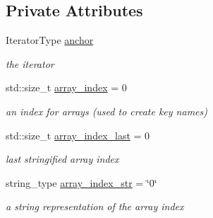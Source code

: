 \subsection*{Private Attributes}
\begin{DoxyCompactItemize}
\item 
\mbox{\label{classnlohmann_1_1detail_1_1iteration__proxy__value_a073741b6536b7a5166467a5515bc59cb}} 
Iterator\+Type \mbox{\hyperlink{classnlohmann_1_1detail_1_1iteration__proxy__value_a073741b6536b7a5166467a5515bc59cb}{anchor}}
\begin{DoxyCompactList}\small\item\em the iterator \end{DoxyCompactList}\item 
\mbox{\label{classnlohmann_1_1detail_1_1iteration__proxy__value_ad3d18c83aff5e9f4bdbf99385b29a39a}} 
std\+::size\+\_\+t \mbox{\hyperlink{classnlohmann_1_1detail_1_1iteration__proxy__value_ad3d18c83aff5e9f4bdbf99385b29a39a}{array\+\_\+index}} = 0
\begin{DoxyCompactList}\small\item\em an index for arrays (used to create key names) \end{DoxyCompactList}\item 
\mbox{\label{classnlohmann_1_1detail_1_1iteration__proxy__value_aac6e7cc0c17242a0a42c14d1e714747c}} 
std\+::size\+\_\+t \mbox{\hyperlink{classnlohmann_1_1detail_1_1iteration__proxy__value_aac6e7cc0c17242a0a42c14d1e714747c}{array\+\_\+index\+\_\+last}} = 0
\begin{DoxyCompactList}\small\item\em last stringified array index \end{DoxyCompactList}\item 
\mbox{\label{classnlohmann_1_1detail_1_1iteration__proxy__value_ab0b34133f45a3610070492d32978f2ea}} 
string\+\_\+type \mbox{\hyperlink{classnlohmann_1_1detail_1_1iteration__proxy__value_ab0b34133f45a3610070492d32978f2ea}{array\+\_\+index\+\_\+str}} = \char`\"{}0\char`\"{}
\begin{DoxyCompactList}\small\item\em a string representation of the array index \end{DoxyCompactList}\item 

\end{DoxyCompactItemize}
